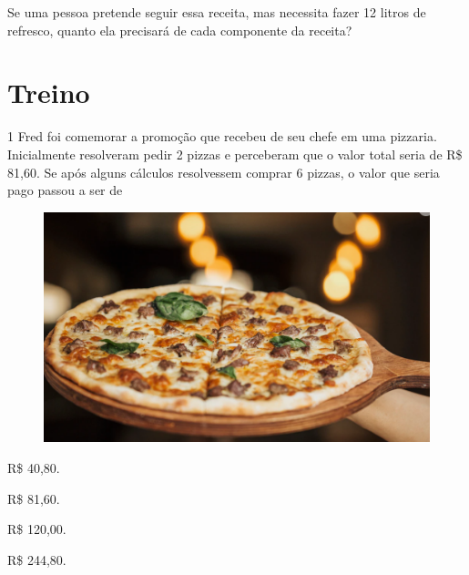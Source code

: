 Se uma pessoa pretende seguir essa receita, mas necessita fazer 12 litros de refresco, quanto ela precisará de cada componente da receita?

\begin{mdframed}[linewidth=2pt,linecolor=salmao]
\mbox{}\vspace*{4cm}
\end{mdframed}

\pagebreak
\section*{Treino}

\num{1} Fred foi comemorar a promoção que recebeu de seu chefe em uma
pizzaria. Inicialmente resolveram pedir 2 pizzas e perceberam que o
valor total seria de R\$ 81,60. Se após alguns cálculos resolvessem
comprar 6 pizzas, o valor que seria pago passou a ser de 

\begin{figure}[htpb!]
\includegraphics[width=\textwidth]{./imgs/mat15.png}
\end{figure}

\begin{escolha}
\item
  R\$ 40,80.
\item
  R\$ 81,60.
\item
  R\$ 120,00.
\item
  R\$ 244,80.
\end{escolha}



